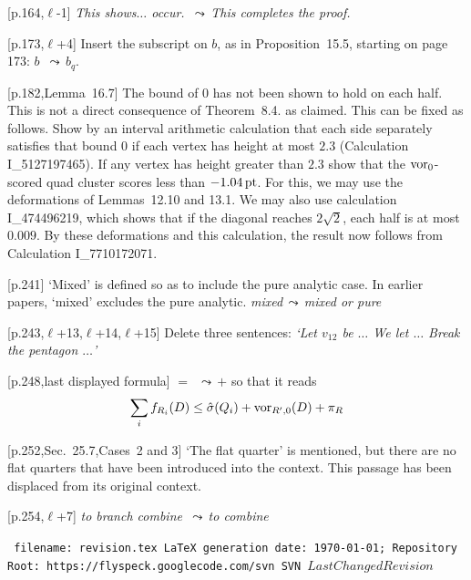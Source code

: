 \documentclass[11pt]{amsart}
\def\svninfo{{\tt
  filename: revision.tex\hfill\break
  LaTeX generation date: \today; \hfill\break
  Repository Root: https://flyspeck.googlecode.com/svn \hfill\break
  SVN $LastChangedRevision$
  }
  }
\def\op#1{{\text{#1}}}
\def\lto{\ensuremath{\,\leadsto\,}}
\def\line{$\ell$}
\def\text{\hbox}
\def\sz{small} %
\def\rmx{\rm}
\begin{document}
\begin{\sz}
[p.164,\line-1] 
	{\it This shows$\ldots$ occur.
	\lto This completes the proof.}


[p.173,\line+4] {\rmx Insert the subscript on $b$,
as in Proposition~15.5, starting on page 173:}
   $b$ \lto $b_q$.



	
[p.182,Lemma~16.7]  {\rmx The bound of $0$ has not been
shown to hold on each half.  This is not a 
direct consequence
of Theorem~8.4. as claimed.
This can be fixed as follows.  Show by an interval arithmetic
calculation that each side separately satisfies
that bound $0$ if each vertex has height at most $2.3$ (Calculation I\_5127197465).
If any vertex has height greater than $2.3$ show that the $\op{vor}_0$-scored quad cluster scores
less than $-1.04\,\op{pt}$.  
For this, we may use the deformations of Lemmas~12.10 and 13.1.  We may also use calculation I\_474496219, which shows that if the diagonal reaches $2\sqrt2$, each half is at most $0.009$.  
By these deformations and this calculation, the result now follows from Calculation I\_7710172071.}


[p.241]  {\rmx `Mixed' is defined so as to include
the pure analytic case.  In earlier papers,
`mixed' excludes the pure analytic.  }
	{\it mixed\lto mixed or pure}
	
[p.243,\line+13,\line+14,\line+15]
	{\rmx Delete three sentences:}
	{\it `Let $v_{12}$ be $\ldots$  We let $\ldots$
	 Break the pentagon $\ldots$'}
	
[p.248,last displayed formula]  
	$=$ \lto $+$
{\rmx so that it reads}
	$$
	\sum_i f_{R_i}(D) \le \hat\sigma(Q_i) +
	\op{vor}_{R',0}(D) + \pi_R
	$$

[p.252,Sec.~25.7,Cases~2 and 3]  {\rmx `The flat quarter'
is mentioned, but there are no flat quarters
that have been introduced into the context.  
This passage
has been displaced from its original context.}

[p.254,\line+7]
{\it to branch combine \lto to combine}
\end{\sz}






\bigskip

\begin{\sz}
\svninfo
\end{\sz}
\end{document}
